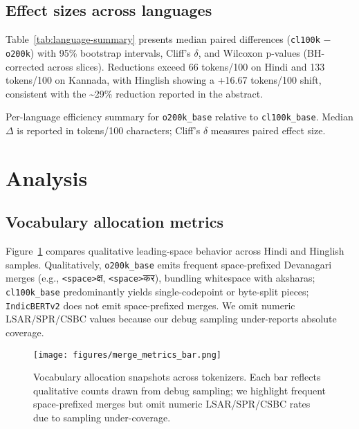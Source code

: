 \documentclass{article}
\newcommand{\devtxt}[1]{{\devanagarifont#1}}
\renewcommand{\textvisiblespace}{\texttt{\textless{}space\textgreater{}}}
\begin{document}
\subsection{Effect sizes across languages}
Table~\ref{tab:language-summary} presents median paired differences (\texttt{cl100k} $-$ \texttt{o200k}) with 95\% bootstrap intervals, Cliff's $\delta$, and Wilcoxon p-values (BH-corrected across slices). Reductions exceed 66 tokens/100 on Hindi and 133 tokens/100 on Kannada, with Hinglish showing a +16.67 tokens/100 shift, consistent with the \textasciitilde29\% reduction reported in the abstract.
\begin{table}[t]
    \centering
    \caption{Per-language efficiency summary for \texttt{o200k\_base} relative to \texttt{cl100k\_base}. Median $\Delta$ is reported in tokens/100 characters; Cliff's $\delta$ measures paired effect size.}\label{tab:language-summary}
    
\end{table}

\section{Analysis}

\subsection{Vocabulary allocation metrics}
Figure~\ref{fig:merge-metrics} compares qualitative leading-space behavior across Hindi and Hinglish samples. Qualitatively, \texttt{o200k\_base} emits frequent space-prefixed Devanagari merges (e.g., {\textvisiblespace}\devtxt{क्ष}, {\textvisiblespace}\devtxt{कर}), bundling whitespace with aksharas; \texttt{cl100k\_base} predominantly yields single-codepoint or byte-split pieces; \texttt{IndicBERTv2} does not emit space-prefixed merges. We omit numeric LSAR/SPR/CSBC values because our debug sampling under-reports absolute coverage.

\begin{figure}[t]
    \centering
    \texttt{[image: figures/merge\_metrics\_bar.png]}
    \caption{Vocabulary allocation snapshots across tokenizers. Each bar reflects qualitative counts drawn from debug sampling; we highlight frequent space-prefixed merges but omit numeric LSAR/SPR/CSBC rates due to sampling under-coverage.}\label{fig:merge-metrics}
\end{figure}
\end{document}
